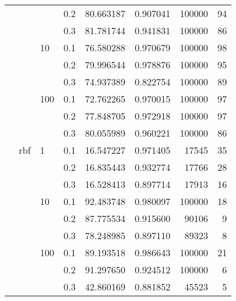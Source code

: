 \begin{table}[H]
\begin{tabular}{llllrrrr}
           &     &     & 0.2 &  80.663187 &  0.907041 &  100000 &    94 \\
           &     &     & 0.3 &  81.781744 &  0.941831 &  100000 &    86 \\
           &     & 10  & 0.1 &  76.580288 &  0.970679 &  100000 &    98 \\
           &     &     & 0.2 &  79.996544 &  0.978876 &  100000 &    95 \\
           &     &     & 0.3 &  74.937389 &  0.822754 &  100000 &    89 \\
           &     & 100 & 0.1 &  72.762265 &  0.970015 &  100000 &    97 \\
           &     &     & 0.2 &  77.848705 &  0.972918 &  100000 &    97 \\
           &     &     & 0.3 &  80.055989 &  0.960221 &  100000 &    86 \\
           & rbf & 1   & 0.1 &  16.547227 &  0.971405 &   17545 &    35 \\
           &     &     & 0.2 &  16.835443 &  0.932774 &   17766 &    28 \\
           &     &     & 0.3 &  16.528413 &  0.897714 &   17913 &    16 \\
           &     & 10  & 0.1 &  92.483748 &  0.980097 &  100000 &    18 \\
           &     &     & 0.2 &  87.775534 &  0.915600 &   90106 &     9 \\
           &     &     & 0.3 &  78.248985 &  0.897110 &   89323 &     8 \\
           &     & 100 & 0.1 &  89.193518 &  0.986643 &  100000 &    21 \\
           &     &     & 0.2 &  91.297650 &  0.924512 &  100000 &     6 \\
           &     &     & 0.3 &  42.860169 &  0.881852 &   45523 &     5 \\
\bottomrule
\end{tabular}
\end{table}
